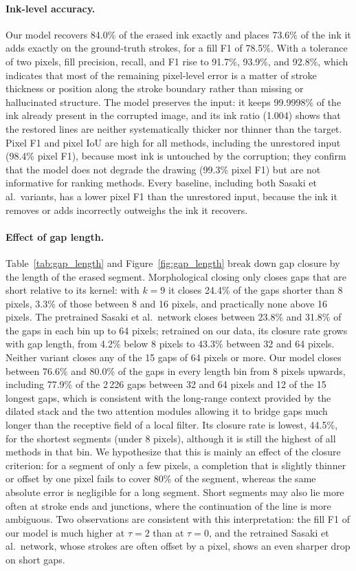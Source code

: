 \documentclass[pdflatex,sn-mathphys-num]{sn-jnl}%
\begin{document}
\paragraph{Ink-level accuracy.} Our model recovers 84.0\% of the erased ink exactly
and places 73.6\% of the ink it adds exactly on the ground-truth strokes, for a fill
F1 of 78.5\%. With a tolerance of two pixels, fill precision, recall, and F1 rise to
91.7\%, 93.9\%, and 92.8\%, which indicates that most of the remaining pixel-level
error is a matter of stroke thickness or position along the stroke boundary rather
than missing or hallucinated structure. The model preserves the input:
it keeps 99.9998\% of the ink already present in the corrupted image, and its ink
ratio (1.004) shows that the restored lines are neither systematically thicker nor
thinner than the target. Pixel F1 and pixel IoU are high for all methods, including
the unrestored input (98.4\% pixel F1), because most ink is untouched by the
corruption; they confirm that the model does not degrade the drawing (99.3\% pixel
F1) but are not informative for ranking methods. Every baseline, including both
Sasaki et al.\ variants, has a lower pixel F1 than the unrestored input, because the ink it removes or adds incorrectly outweighs the ink it recovers.

\paragraph{Effect of gap length.} Table~\ref{tab:gap_length} and
Figure~\ref{fig:gap_length} break down gap closure by the length of the erased
segment. Morphological closing only closes gaps that are short relative to its
kernel: with $k = 9$ it closes 24.4\% of the gaps shorter than 8 pixels, 3.3\% of
those between 8 and 16 pixels, and practically none above 16 pixels. The pretrained
Sasaki et al.\ network closes between 23.8\% and 31.8\% of the gaps in each bin up to
64 pixels; retrained on our data, its closure rate grows with gap length, from 4.2\%
below 8 pixels to 43.3\% between 32 and 64 pixels. Neither variant closes any of the
15 gaps of 64 pixels or more. Our model closes between 76.6\% and 80.0\% of the gaps
in every length bin from 8 pixels upwards, including 77.9\% of the 2\,226 gaps between
32 and 64 pixels and 12 of the 15 longest gaps, which is consistent with the long-range context provided by the dilated stack and the two attention modules allowing it to bridge gaps much longer than the receptive field of a local filter. Its closure rate
is lowest, 44.5\%, for the shortest segments (under 8 pixels), although it is still
the highest of all methods in that bin. We hypothesize that this is mainly an effect
of the closure criterion: for a segment of only a few pixels, a completion that is
slightly thinner or offset by one pixel fails to cover 80\% of the segment, whereas
the same absolute error is negligible for a long segment. Short segments may also lie
more often at stroke ends and junctions, where the continuation of the line is more
ambiguous. Two observations are consistent with this interpretation: the fill F1 of
our model is much higher at $\tau=2$ than at $\tau=0$, and the retrained Sasaki et
al.\ network, whose strokes are often offset by a pixel, shows an even sharper drop
on short gaps.
\end{document}
